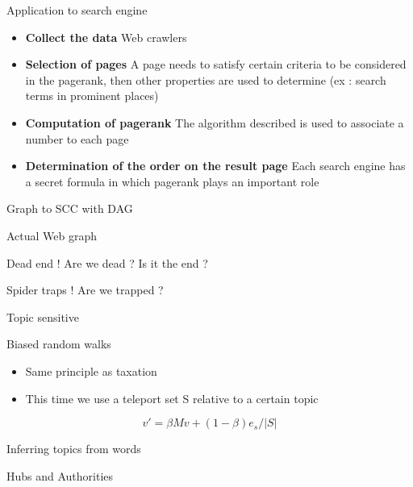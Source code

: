 \documentclass[10pt]{beamer}
\begin{document}
\begin{frame}{Application to search engine}
\begin{itemize}
\item \textbf{Collect the data} Web crawlers
\item \textbf{Selection of pages} A page needs to satisfy certain criteria to be considered in the pagerank, then other properties are used to determine (ex : search terms in prominent places)
\item \textbf{Computation of pagerank} The algorithm described is used to associate a number to each page
\item \textbf{Determination of the order on the result page} Each search engine has a secret formula in which pagerank plays an important role
\end{itemize}
\end{frame}
\begin{frame}{Graph to SCC with DAG}
\end{frame}

\begin{frame}{Actual Web graph}
\end{frame}

\begin{frame}{Dead end ! Are we dead ? Is it the end ?}
\end{frame}

\begin{frame}{Spider traps ! Are we trapped ?}
\end{frame}

\begin{frame}{Topic sensitive}
  \begin{block}{Biased random walks}
  \begin{itemize}
  \item Same principle as taxation
  \item This time we use a teleport set S relative to a certain topic
  \end{itemize}
  $$ v' = \beta Mv + (1-\beta)e_s/|S|$$
  \end{block}
\end{frame}
\begin{frame}{Inferring topics from words}

\end{frame}
\begin{frame}{Hubs and Authorities}
\end{frame}
\end{document}
